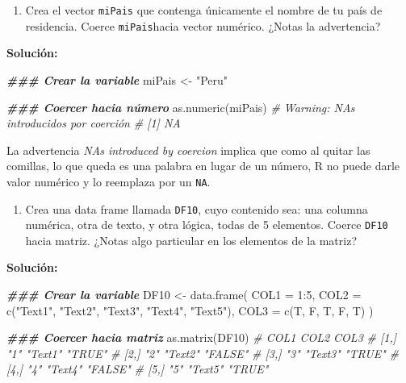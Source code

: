 \documentclass[
]{article}
\newenvironment{Shaded}{\begin{snugshade}}{\end{snugshade}}
\newcommand{\AttributeTok}[1]{\textcolor[rgb]{0.77,0.63,0.00}{#1}}
\newcommand{\CommentTok}[1]{\textcolor[rgb]{0.56,0.35,0.01}{\textit{#1}}}
\newcommand{\DecValTok}[1]{\textcolor[rgb]{0.00,0.00,0.81}{#1}}
\newcommand{\DocumentationTok}[1]{\textcolor[rgb]{0.56,0.35,0.01}{\textbf{\textit{#1}}}}
\newcommand{\FunctionTok}[1]{\textcolor[rgb]{0.00,0.00,0.00}{#1}}
\newcommand{\NormalTok}[1]{#1}
\newcommand{\OtherTok}[1]{\textcolor[rgb]{0.56,0.35,0.01}{#1}}
\newcommand{\SpecialCharTok}[1]{\textcolor[rgb]{0.00,0.00,0.00}{#1}}
\newcommand{\StringTok}[1]{\textcolor[rgb]{0.31,0.60,0.02}{#1}}
\providecommand{\tightlist}{%
  \setlength{\itemsep}{0pt}\setlength{\parskip}{0pt}}
\theoremstyle{definition}
\theoremstyle{definition}
\theoremstyle{definition}
\theoremstyle{definition}
\theoremstyle{remark}
\begin{document}
\begin{enumerate}
\def\labelenumi{\arabic{enumi}.}
\tightlist
\item
  Crea el vector \texttt{miPais} que contenga únicamente el nombre de tu país de residencia. Coerce \texttt{miPais}hacia vector numérico. ¿Notas la advertencia?
\end{enumerate}

\textbf{Solución:}

\begin{Shaded}
\begin{Highlighting}[]
\DocumentationTok{\#\#\# Crear la variable}
\NormalTok{miPais }\OtherTok{\textless{}{-}} \StringTok{"Peru"}

\DocumentationTok{\#\#\# Coercer hacia número}
\FunctionTok{as.numeric}\NormalTok{(miPais)}
\CommentTok{\# Warning: NAs introducidos por coerción}
\CommentTok{\# [1] NA}
\end{Highlighting}
\end{Shaded}

La advertencia \emph{NAs introduced by coercion} implica que como al quitar las comillas, lo que queda es una palabra en lugar de un número, R no puede darle valor numérico y lo reemplaza por un \texttt{NA}.

\begin{enumerate}
\def\labelenumi{\arabic{enumi}.}
\tightlist
\item
  Crea una data frame llamada \texttt{DF10}, cuyo contenido sea: una columna numérica, otra de texto, y otra lógica, todas de 5 elementos. Coerce \texttt{DF10} hacia matriz. ¿Notas algo particular en los elementos de la matriz?
\end{enumerate}

\textbf{Solución:}

\begin{Shaded}
\begin{Highlighting}[]
\DocumentationTok{\#\#\# Crear la variable}
\NormalTok{DF10 }\OtherTok{\textless{}{-}} \FunctionTok{data.frame}\NormalTok{(}
  \AttributeTok{COL1 =} \DecValTok{1}\SpecialCharTok{:}\DecValTok{5}\NormalTok{,}
  \AttributeTok{COL2 =} \FunctionTok{c}\NormalTok{(}\StringTok{"Text1"}\NormalTok{, }\StringTok{"Text2"}\NormalTok{, }\StringTok{"Text3"}\NormalTok{, }\StringTok{"Text4"}\NormalTok{, }\StringTok{"Text5"}\NormalTok{),}
  \AttributeTok{COL3 =} \FunctionTok{c}\NormalTok{(T, F, T, F, T)}
\NormalTok{)}

\DocumentationTok{\#\#\# Coercer hacia matriz}
\FunctionTok{as.matrix}\NormalTok{(DF10)}
\CommentTok{\#      COL1 COL2    COL3   }
\CommentTok{\# [1,] "1"  "Text1" "TRUE" }
\CommentTok{\# [2,] "2"  "Text2" "FALSE"}
\CommentTok{\# [3,] "3"  "Text3" "TRUE" }
\CommentTok{\# [4,] "4"  "Text4" "FALSE"}
\CommentTok{\# [5,] "5"  "Text5" "TRUE"}
\end{Highlighting}
\end{Shaded}
\end{document}
